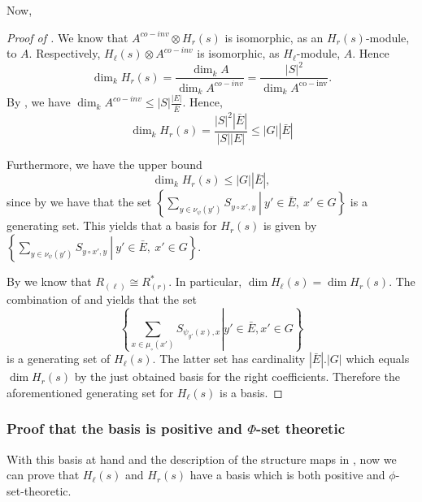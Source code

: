 \documentclass[a4paper,10pt]{amsart}
\theoremstyle{definition}
\theoremstyle{remark}
\begin{document}
Now, 
\begin{proof}[Proof of ]


We know that $A^{co-inv}\otimes H_r(s)$ is isomorphic, as an $H_r(s)$-module, to $A$. Respectively, $H_{\ell}(s) \otimes A^{co-inv}$ is isomorphic, as $H_{\ell}$-module, $A$. Hence
$$\dim_k H_r(s)=\frac{\dim_k A}{\dim_k A^{co-inv}}
=\frac{|S|^2}{\dim_k A^{\mathrm{co-inv}}}.$$ 
By , we have $\dim_k A^{co-inv}\le |S|\frac{|E|}{\bar{E}}$. Hence, 
$$\dim_k H_r(s)= \dfrac{|S|^2|\bar{E}|}{|S||E|}\leq |G||\bar{E}|$$

Furthermore, we have the upper bound
$$\dim_k H_r(s) \leq |G||\bar{E}|,$$ since by  we have that the set $\left\{\left.\sum_{y\in \nu_{\psi}(y')}S_{y\circ x', y} \ \right|\ y' \in \bar{E},\ x'\in G\right\}$ is a generating set. This yields that a basis for $H_r(s)$ is given by $\left\{\left.\sum_{y\in \nu_{\psi}(y')}S_{y\circ x', y} \ \right|\ y' \in \bar{E},\ x'\in G\right\}$.

By \cite[Theorem 2.1]{Mi04} we know that $R_{(\ell)} \cong R_{(r)}^*$. In particular, $\dim H_{\ell}(s) = \dim H_r(s)$. The combination of  and  yields that the set  
$$\left\{\left. \sum_{x\in \mu_{\circ}(x')}S_{\psi_{y'}(x),x} \right| y'\in \bar{E}, x'\in G \right\}$$
is a generating set of $H_{\ell}(s)$. The latter set has cardinality $|\bar{E}|.|G|$ which equals $\dim H_r(s)$ by the just obtained basis for the right coefficients. Therefore the aforementioned generating set for $H_{\ell}(s)$ is a basis.
\end{proof}

\subsubsection{Proof that the basis is positive and $\Phi$-set theoretic}
With this basis at hand and the description of the structure maps in , now we can prove that $H_{\ell}(s)$ and $H_r(s)$ have a basis which is both positive and $\phi$-set-theoretic.
\end{document}
